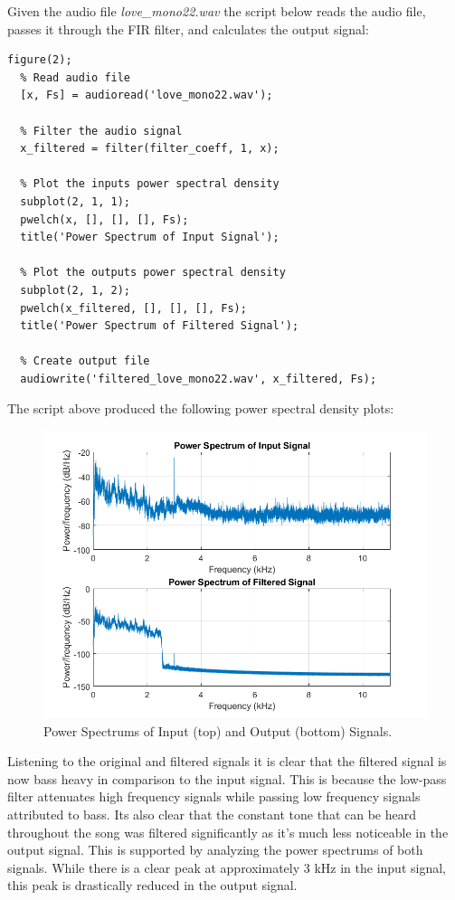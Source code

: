 \documentclass[a4paper, 10pt]{article}
\begin{document}
\noindent Given the audio file \textit{love\_mono22.wav} the script below reads the audio file, passes it through
the FIR filter, and calculates the output signal:
\begin{lstlisting}[style=Matlab-editor, basicstyle=\small\ttfamily]
  figure(2);
  % Read audio file
  [x, Fs] = audioread('love_mono22.wav');

  % Filter the audio signal
  x_filtered = filter(filter_coeff, 1, x);

  % Plot the inputs power spectral density
  subplot(2, 1, 1);
  pwelch(x, [], [], [], Fs);
  title('Power Spectrum of Input Signal');

  % Plot the outputs power spectral density
  subplot(2, 1, 2);
  pwelch(x_filtered, [], [], [], Fs);
  title('Power Spectrum of Filtered Signal');

  % Create output file
  audiowrite('filtered_love_mono22.wav', x_filtered, Fs);
\end{lstlisting}
The script above produced the following power spectral density plots:
\begin{figure}[H]
  \centering
  \includegraphics[width=13cm]{images/q1_e.png}
  \caption{Power Spectrums of Input (top) and Output (bottom) Signals.}
\end{figure}
Listening to the original and filtered signals it is clear that the filtered signal is now bass heavy in comparison
to the input signal. This is because the low-pass filter attenuates high frequency signals while passing low frequency
signals attributed to bass. Its also clear that the constant tone that can be heard throughout the song was filtered
significantly as it's much less noticeable in the output signal. This is supported by analyzing the power spectrums of
both signals. While there is a clear peak at approximately 3 kHz in the input signal, this peak is drastically reduced
in the output signal.
\end{document}
